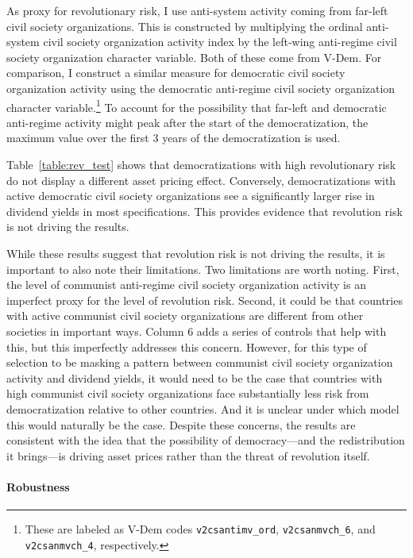 \documentclass[12pt]{article}
\numberwithin{equation}{section}
\begin{document}
As proxy for revolutionary risk, I use anti-system activity coming from far-left civil society organizations. This is constructed by multiplying the ordinal anti-system civil society organization activity index by the left-wing anti-regime civil society organization character variable. Both of these come from V-Dem. For comparison, I construct a similar measure for democratic civil society organization activity using the democratic anti-regime civil society organization character variable.\footnote{These are labeled as V-Dem codes  \texttt{v2csantimv\_ord}, \texttt{v2csanmvch\_6}, and \texttt{v2csanmvch\_4}, respectively.} To account for the possibility that far-left and democratic anti-regime activity might peak after the start of the democratization, the maximum value over the first 3 years of the democratization is used.

Table~\ref{table:rev_test} shows that democratizations with high revolutionary risk do not display a different asset pricing effect. Conversely, democratizations with active democratic civil society organizations see a significantly larger rise in dividend yields in most specifications. This provides evidence that revolution risk is not driving the results.

\label{par:rev_risk_hard}
While these results suggest that revolution risk is not driving the results, it is important to also note their limitations. Two limitations are worth noting. First, the level of communist anti-regime civil society organization activity is an imperfect proxy for the level of revolution risk. Second, it could be that countries with active communist civil society organizations are different from other societies in important ways. Column 6 adds a series of controls that help with this, but this imperfectly addresses this concern. However, for this type of selection to be masking a pattern between communist civil society organization activity and dividend yields, it would need to be the case that countries with high communist civil society organizations face substantially less risk from democratization relative to other countries. And it is unclear under which model this would naturally be the case.  Despite these concerns, the results are consistent with the idea that the possibility of democracy---and the redistribution it brings---is driving asset prices rather than the threat of revolution itself.
\label{par:rev_risk_end}

\paragraph{Robustness}
\end{document}
